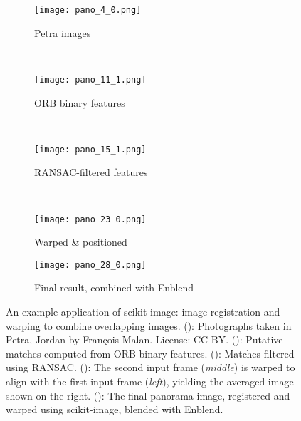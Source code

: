 
\begin{figure}
\begin{frame}{}

\begin{minipage}{.49\textwidth}

  \begin{subfigure}{\linewidth}
    \centering
    \texttt{[image: pano\_4\_0.png]}
    \caption{Petra images\label{fig:petra}}
  \end{subfigure} \\ [0.5ex]  %

  \begin{subfigure}{\linewidth}
    \centering
    \texttt{[image: pano\_11\_1.png]}
    \caption{ORB binary features\label{fig:putativematches}}
  \end{subfigure} \\ [0.5ex]  %

  \begin{subfigure}{\linewidth}
    \centering
    \texttt{[image: pano\_15\_1.png]}
    \caption{RANSAC-filtered features\label{fig:matchesfiltered}}
  \end{subfigure} \\ [0.5ex]  %

  \begin{subfigure}{\linewidth}
    \centering
    \texttt{[image: pano\_23\_0.png]}
    \caption{Warped \& positioned\label{fig:merged}}
  \end{subfigure}
\end{minipage}%
\begin{minipage}{.5\textwidth}
  \begin{subfigure}{\linewidth}
    \centering
    \texttt{[image: pano\_28\_0.png]}
    \caption{Final result, combined with Enblend\label{fig:pano}}
  \end{subfigure}
\end{minipage}%
\end{frame}

\caption{An example application of scikit-image: image registration and warping to combine overlapping images. (): Photographs taken in Petra, Jordan by François Malan. License: CC-BY. (): Putative matches computed from ORB binary features. (): Matches filtered using RANSAC. (): The second input frame (\textit{middle}) is warped to align with the first input frame (\textit{left}), yielding the averaged image shown on the right. (): The final panorama image, registered and warped using scikit-image, blended with Enblend.\label{fig:pano_overall}}

\end{figure}
